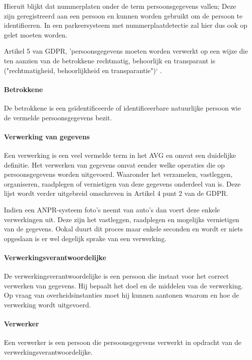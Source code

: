 Hieruit blijkt dat nummerplaten onder de term persoonsgegevens vallen; Deze zijn geregistreerd aan een persoon en kunnen worden gebruikt om de persoon te identificeren. In een parkeersysteem met nummerplaatdetectie zal hier dus ook op gelet moeten worden. 

Artikel 5 van GDPR, 'persoonsgegevens moeten worden verwerkt op een wijze die ten aanzien van de betrokkene rechtmatig, behoorlijk en transparant is ("rechtmatigheid, behoorlijkheid en transparantie")` \autocite{avg2018privacy}.

\paragraph{Betrokkene}
De betrokkene is een geïdentificeerde of identificeerbare natuurlijke persoon wie de vermelde persoonsgegevens bezit.

\paragraph{Verwerking van gegevens}
Een verwerking is een veel vermelde term in het AVG en omvat een duidelijke definitie. Het verwerken van gegevens omvat eender welke operaties die op persoonsgegevens worden uitgevoerd. Waaronder het verzamelen, vastleggen, organiseren, raadplegen of vernietigen van deze gegevens onderdeel van is. Deze lijst wordt verder uitgebreid omschreven in Artikel 4 punt 2 van de GDPR.

Indien een ANPR-systeem foto's neemt van auto's dan voert deze enkele verwerkingen uit. Deze zijn het vastleggen, raadplegen en mogelijks vernietigen van de gegevens. Ookal duurt dit proces maar enkele seconden en wordt er niets opgeslaan is er wel degelijk sprake van een verwerking.

\paragraph{Verwerkingsverantwoordelijke}
De verwerkingsverantwoordelijke is een persoon die instaat voor het correct verwerken van gegevens. Hij bepaalt het doel en de middelen van de verwerking. Op vraag van overheidsinstanties moet hij kunnen aantonen waarom en hoe de verwerking wordt uitgevoerd.

\paragraph{Verwerker}
Een verwerker is een persoon die persoonsgegevens verwerkt in opdracht van de verwerkingsverantwoordelijke.

